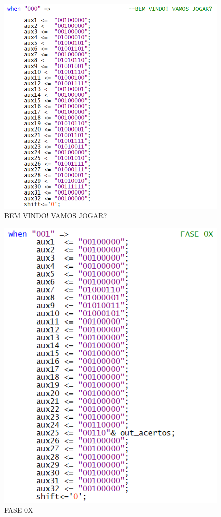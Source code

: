 \documentclass[14pt, oneside]{book}
\theoremstyle{definition}
\begin{document}
                \begin{figure}[H]
                    \centering
                    \includegraphics[scale=1]{lcdexample1.png}
                    \caption{BEM VINDO! VAMOS JOGAR?}
                    \label{lcdexample1}
                \end{figure}
                
                \begin{figure}[H]
                    \centering
                    \includegraphics[scale=1]{lcdexample2.png}
                    \caption{FASE 0X}
                    \label{lcdexample2}
                \end{figure}
                
\end{document}
